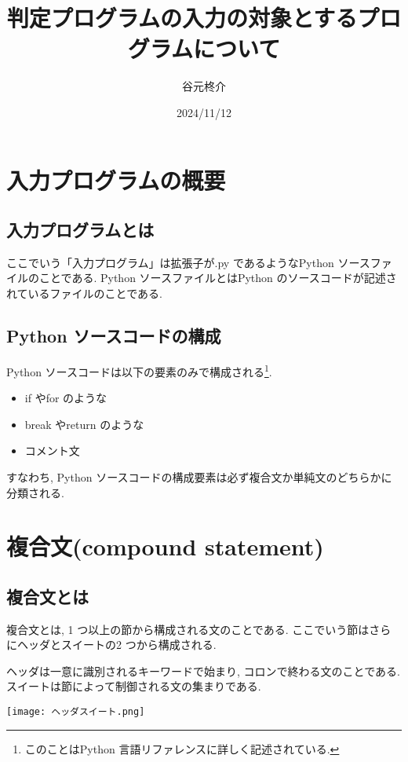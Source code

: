 \documentclass{jlreq}
\title{判定プログラムの入力の対象とするプログラムについて}
\author{谷元柊介}
\date{2024/11/12}
\begin{document}
    \maketitle
    \section{入力プログラムの概要}
        \subsection{入力プログラムとは}
        ここでいう「入力プログラム」は拡張子が.py であるようなPython ソースファイルのことである. Python ソースファイルとはPython のソースコードが記述されているファイルのことである.

        \subsection{Python ソースコードの構成}
        Python ソースコードは以下の要素のみで構成される\footnote{このことはPython 言語リファレンスに詳しく記述されている\cite{目次}.}.
        \begin{itemize}
            \item if やfor のような
            \item break やreturn のような
            \item コメント文
        \end{itemize}
        すなわち, Python ソースコードの構成要素は必ず複合文か単純文のどちらかに分類される.

    \section{複合文(compound statement)}
        \subsection{複合文とは}
            複合文とは, 1 つ以上の節から構成される文のことである\cite{目次}. ここでいう節はさらにヘッダとスイートの2 つから構成される.

            ヘッダは一意に識別されるキーワードで始まり, コロンで終わる文のことである. スイートは節によって制御される文の集まりである\cite{目次}.
            
            \texttt{[image: ヘッダスイート.png]}    
                
\end{document}

